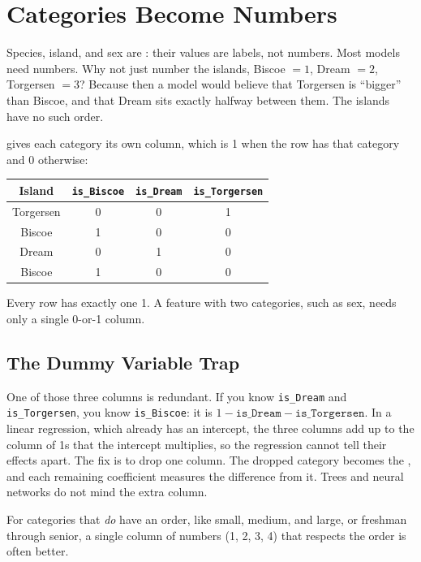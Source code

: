 \section{Categories Become Numbers}
Species, island, and sex are : their values are labels, not numbers. Most models
need numbers. Why not just number the islands, Biscoe $= 1$, Dream $= 2$, Torgersen $= 3$? Because then a model
would believe that Torgersen is ``bigger'' than Biscoe, and that Dream sits exactly halfway between them. The
islands have no such order.

 gives each category its own column, which is 1 when the row
has that category and 0 otherwise:

\begin{center}
\begin{tabular}{c|ccc}
Island & \texttt{is\_Biscoe} & \texttt{is\_Dream} & \texttt{is\_Torgersen} \\
\hline
Torgersen & 0 & 0 & 1 \\
Biscoe & 1 & 0 & 0 \\
Dream & 0 & 1 & 0 \\
Biscoe & 1 & 0 & 0 \\
\end{tabular}
\end{center}

Every row has exactly one 1. A feature with two categories, such as sex, needs only a single 0-or-1 column.

\subsection{The Dummy Variable Trap}
One of those three columns is redundant. If you know \texttt{is\_Dream} and \texttt{is\_Torgersen}, you know
\texttt{is\_Biscoe}: it is $1 - \texttt{is\_Dream} - \texttt{is\_Torgersen}$. In a linear regression, which
already has an intercept, the three columns add up to the column of 1s that the intercept multiplies, so the
regression cannot tell their effects apart. The fix is to drop one column. The dropped category becomes the
, and each remaining coefficient measures the difference from it.
Trees and neural networks do not mind the extra column.

For categories that \emph{do} have an order, like small, medium, and large, or freshman through senior, a
single column of numbers (1, 2, 3, 4) that respects the order is often better.

